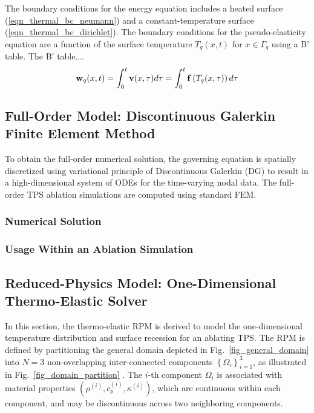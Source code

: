 The boundary conditions for the energy equation includes a heated surface (\cref{eqn_thermal_bc_neumann}) and a constant-temperature surface (\cref{eqn_thermal_bc_dirichlet}). The boundary conditions for the pseudo-elasticity equation are a function of the surface temperature $T_q(x,t)$ for $x\in\Gamma_q$ using a B' table. The B' table....
\begin{equation}
    \mathbf{w}_q(x,t) = \int_{0}^{t} \mathbf{v}(x,\tau)d\tau = \int_{0}^{t}\mathbf{f}\left(T_q(x,\tau)\right)d\tau\label{eqn_boundary_displacement}
\end{equation}


\subsection{Full-Order Model: Discontinuous Galerkin Finite Element Method}\label{sec_fom}

To obtain the full-order numerical solution, the governing equation is spatially discretized using variational principle of Discontinuous Galerkin (DG) to result in a high-dimensional system of ODEs for the time-varying nodal data. The full-order TPS ablation simulations are computed using standard FEM.

\subsubsection{Numerical Solution}

\subsubsection{Usage Within an Ablation Simulation}


\subsection{Reduced-Physics Model: One-Dimensional Thermo-Elastic Solver}

In this section, the thermo-elastic RPM is derived to model the one-dimensional temperature distribution and surface recession for an ablating TPS. The RPM is defined by partitioning the general domain depicted in Fig.~\ref{fig_general_domain} into $N=3$ non-overlapping inter-connected components $\left\{\Omega_i\right\}_{i=1}^{3}$, as illustrated in Fig.~\ref{fig_domain_partition} . The $i$-th component $\Omega_i$ is associated with material properties $\left(\rho^{(i)}, c^{(i)}_{p}, \kappa^{(i)}\right)$, which are continuous within each component, and may be discontinuous across two neighboring components.


